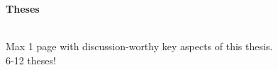 \thispagestyle{noheader}

\begin{large}
	\textbf{Theses} \\ \\
\end{large}

Max 1 page with discussion-worthy key aspects of this thesis.\\
6-12 theses!
